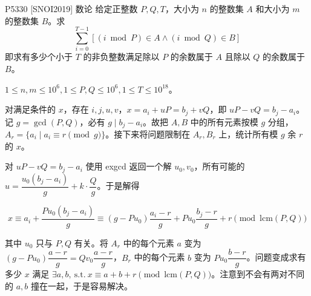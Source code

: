 \documentclass [hyperref={bookmarksdepth=4}, aspectratio=169] {beamer}
\theoremstyle {fy}
\begin{document}
\begin{frame}{P5330 [SNOI2019] 数论}
给定正整数 $P,Q,T$，大小为 $n$ 的整数集 $A$ 和大小为 $m$ 的整数集 $B$。求
$$
\sum_{i=0}^{T-1}[(i\bmod P)\in A \wedge(i\bmod Q)\in B]
$$
即求有多少个小于 $T$ 的非负整数满足除以 $P$ 的余数属于 $A$ 且除以 $Q$ 的余数属于 $B$。

$1\le n,m\le 10^6,1\le P,Q\le 10^6,1\le T\le 10^{18}$。

对满足条件的 $x$，存在 $i,j,u,v$，$x=a_i+uP=b_j+vQ$，即 $uP-vQ=b_j-a_i$。记 $g=\gcd(P,Q)$，必有 $g\mid b_j-a_i$。故把 $A,B$ 中的所有元素按模 $g$ 分组，$A_r=\{a_i\mid a_i\equiv r\pmod g\}$。接下来将问题限制在 $A_r,B_r$ 上，统计所有模 $g$ 余 $r$ 的 $x$。

对 $uP-vQ=b_j-a_i$ 使用 exgcd 返回一个解 $u_0,v_0$，所有可能的 $u=\dfrac{u_0(b_j-a_i)}{g}+k\cdot\dfrac{Q}{g}$。于是解得

$$
x\equiv a_i+\dfrac{Pu_0(b_j-a_i)}{g}\equiv (g-Pu_0)\dfrac{a_i-r}{g}+Pu_0\dfrac{b_j-r}{g}+r\pmod{\mathrm{lcm}(P,Q)}
$$

其中 $u_0$ 只与 $P,Q$ 有关。将 $A_r$ 中的每个元素 $a$ 变为 $(g-Pu_0)\dfrac{a-r}{g}=Qv_0\dfrac{a-r}{g}$，$B_r$ 中的每个元素 $b$ 变为 $Pu_0\dfrac{b-r}{g}$。问题变成求有多少 $x$ 满足 $\exists a,b,\ \mathrm{s.t.}\ x\equiv a+b+r\pmod{\mathrm{lcm}(P,Q)}$。注意到不会有两对不同的 $a,b$ 撞在一起，于是容易解决。
\end{frame}
\end{document}
